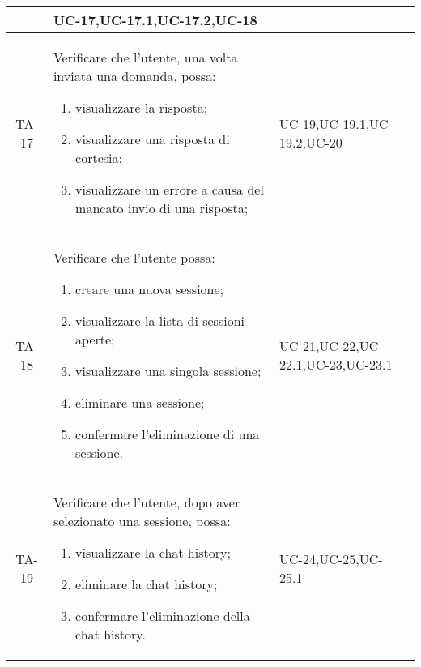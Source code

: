 \begin{xltabular}{\textwidth}{| c | X | X | c |}
\begin{enumerate}
    \end{enumerate}& UC-17,\newline UC-17.1,\newline UC-17.2,\newline UC-18 & \textcolor{xmarkcolor}{} \\
    \hline
    TA-17 & Verificare che l’utente, una volta inviata una domanda, possa:
    \begin{enumerate}
        \item visualizzare la risposta;
        \item visualizzare una risposta di cortesia;
        \item visualizzare un errore a causa del mancato invio di una risposta;

    \end{enumerate}& UC-19,\newline UC-19.1,\newline UC-19.2,\newline UC-20 & \textcolor{xmarkcolor}{} \\
    \hline
     TA-18 & Verificare che l’utente possa:
    \begin{enumerate}
        \item creare una nuova sessione;
        \item visualizzare la lista di sessioni aperte;
        \item visualizzare una singola sessione;
        \item eliminare una sessione;
        \item confermare l'eliminazione di una sessione.
        
        
    \end{enumerate}& UC-21,\newline UC-22,\newline UC-22.1,\newline UC-23,\newline UC-23.1 & \textcolor{xmarkcolor}{} \\
    \hline
    TA-19 & Verificare che l'utente, dopo aver selezionato una sessione, possa:
    \begin{enumerate}
        \item visualizzare la chat history;
        \item eliminare la chat history;
        \item confermare l'eliminazione della chat history.
        
    \end{enumerate}& UC-24,\newline UC-25,\newline UC-25.1 & \textcolor{xmarkcolor}{}  \\
    \hline
    

\end{xltabular}
